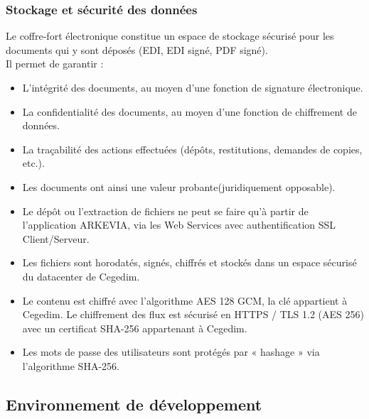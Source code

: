 \subsubsection{Stockage et sécurité des données}
Le coffre-fort électronique constitue un espace de stockage sécurisé pour les documents qui y sont déposés (EDI, EDI signé, PDF signé).\\
Il permet de garantir :
\begin{itemize}
    \item L'intégrité des documents, au moyen d’une fonction de signature électronique.
    \item La confidentialité des documents, au moyen d’une fonction de chiffrement de données.
    \item La traçabilité des actions effectuées (dépôts, restitutions, demandes de copies, etc.).
    \item Les documents ont ainsi une valeur probante(juridiquement opposable).\\
\end{itemize}
\begin{itemize}[leftmargin=*]
    \item[\textcolor{green5!30!white}{\faCheckCircleO}] Le dépôt ou l'extraction de fichiers ne peut se faire qu'à partir de l'application ARKEVIA, via les Web Services avec authentification SSL Client/Serveur.
    \item[\textcolor{green5!30!white}{\faCheckCircleO}] Les fichiers sont horodatés, signés, chiffrés et stockés dans un espace sécurisé du datacenter de Cegedim.\newpage
    \item[\textcolor{green5!30!white}{\faCheckCircleO}] Le contenu est chiffré avec l'algorithme AES 128 GCM, la clé appartient à Cegedim. Le chiffrement des flux est sécurisé en HTTPS / TLS 1.2 (AES 256) avec un certificat SHA-256 appartenant à Cegedim.
    \item[\textcolor{green5!30!white}{\faCheckCircleO}] Les mots de passe des utilisateurs sont protégés par « hashage » via l'algorithme SHA-256.
\end{itemize}
\subsection{Environnement de développement}
